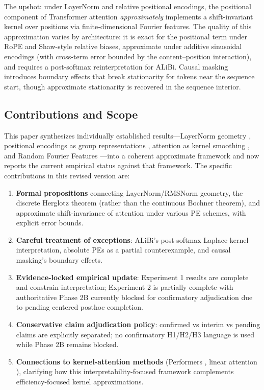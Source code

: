 \documentclass[11pt]{article}
\theoremstyle{definition}
\begin{document}
The upshot: under LayerNorm and relative positional encodings, the positional component of Transformer attention \emph{approximately} implements a shift-invariant kernel over positions via finite-dimensional Fourier features. The quality of this approximation varies by architecture: it is exact for the positional term under RoPE and Shaw-style relative biases, approximate under additive sinusoidal encodings (with cross-term error bounded by the content--position interaction), and requires a post-softmax reinterpretation for ALiBi. Causal masking introduces boundary effects that break stationarity for tokens near the sequence start, though approximate stationarity is recovered in the sequence interior.

\subsection{Contributions and Scope}

This paper synthesizes individually established results---LayerNorm geometry \cite{ba2016layer}, positional encodings as group representations \cite{vaswani2017attention,su2021roformer,lim2024positional}, attention as kernel smoothing \cite{tsai2019transformer}, and Random Fourier Features \cite{rahimi2007random}---into a coherent approximate framework and now reports the current empirical status against that framework. The specific contributions in this revised version are:
\begin{enumerate}
    \item \textbf{Formal propositions} connecting LayerNorm/RMSNorm geometry, the discrete Herglotz theorem (rather than the continuous Bochner theorem), and approximate shift-invariance of attention under various PE schemes, with explicit error bounds.
    \item \textbf{Careful treatment of exceptions}: ALiBi's post-softmax Laplace kernel interpretation, absolute PEs as a partial counterexample, and causal masking's boundary effects.
    \item \textbf{Evidence-locked empirical update}: Experiment 1 results are complete and constrain interpretation; Experiment 2 is partially complete with authoritative Phase 2B currently blocked for confirmatory adjudication due to pending centered posthoc completion.
    \item \textbf{Conservative claim adjudication policy}: confirmed vs interim vs pending claims are explicitly separated; no confirmatory H1/H2/H3 language is used while Phase 2B remains blocked.
    \item \textbf{Connections to kernel-attention methods} (Performers \cite{choromanski2021performers}, linear attention \cite{katharopoulos2020linear}), clarifying how this interpretability-focused framework complements efficiency-focused kernel approximations.
\end{enumerate}
\end{document}
